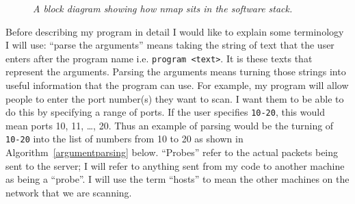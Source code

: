 \documentclass[titlepage]{article}
\begin{document}
\begin{figure}[H]

  \begin{framed}

  \centering

  \end{framed}

  \caption{\textit{%
    A block diagram showing how nmap sits in the software stack.
}}\label{nmapblock}

\end{figure}

Before describing my program in detail I would like to explain some terminology I will use:
``parse the arguments'' means taking the string of text that the user enters after the program name i.e. 
\verb|program <text>|. It is these texts that represent the arguments. Parsing the arguments
means turning those strings into useful information that the program can use.
For example, my program will allow people to enter the port number(s) they want to scan.
I want them to be able to do this by specifying a range of ports.
If the user specifies \verb|10-20|, this would mean ports 10, 11, \ldots, 20.
Thus an example of parsing would be the turning of \verb|10-20| into the list of numbers
from 10 to 20 as shown in Algorithm~\ref{argumentparsing} below.
``Probes'' refer to the actual packets being sent to the server;
I will refer to anything sent from my code to another machine as being a ``probe''.
I will use the term ``hosts'' to mean the other machines on the network that we are scanning.
\end{document}
